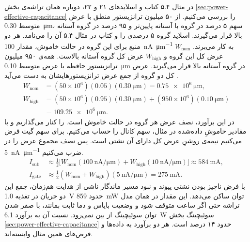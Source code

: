 در مثال ۵.۴ کتاب و اسلایدهای ۲۱ و ۲۲، دوباره همان تراشه‌ی بخش
\ref{sec:power-effective-capacitance} را بررسی می‌کنیم. از ۵۰ میلیون
ترانزیستور منطق با عرض متوسط \qty{0.30}{\micro\metre}، سهم
۵ درصد در گروه با آستانه پایین‌تر و ۹۵ درصد در گروه آستانه بالا
قرار می‌گیرند. اسلاید گروه ۵ درصدی را  و
کتاب در مثال ۵.۴ آن را  می‌نامد. هر دو منبع
برای این گروه در حالت خاموش، مقدار
\qty[per-mode=symbol]{100}{\nano\ampere\per\micro\metre}
به کار می‌برند. \(W_{\mathrm{nom}}\) عرض کل این گروه و
\(W_{\mathrm{high}}\) عرض کل گروه آستانه بالاست.
همه‌ی ۹۵۰ میلیون ترانزیستور حافظه با عرض متوسط
\qty{0.10}{\micro\metre} در گروه آستانه بالا قرار می‌گیرند.
عرض کل دو گروه از جمع عرض ترانزیستورهایشان به دست می‌آید
\cite[مثال ۵.۴، صفحه ۱۹۷]{weste}\cite[اسلایدهای ۲۱ و ۲۲]{powerslides}.
\[
  \begin{aligned}
    W_{\mathrm{nom}}&=(50\times10^6)(0.05)
                       (\qty{0.30}{\micro\metre})
                     =\qty{0.75e6}{\micro\metre},\\
    W_{\mathrm{high}}&=(50\times10^6)(0.95)
                        (\qty{0.30}{\micro\metre})
                        +(950\times10^6)(\qty{0.10}{\micro\metre})\\
                    &=\qty{109.25e6}{\micro\metre}.
  \end{aligned}
\]
در این برآورد، نصف عرض هر گروه در حالت خاموش است. 
را کنار می‌گذاریم و با مقادیر خاموشِ داده‌شده در مثال، سهم کانال را
حساب می‌کنیم. برای سهم گیت فرض می‌کنیم نیمه‌ی روشنِ عرض کل دارای
آن نشتی است. پس نصف مجموع عرض را در
\qty[per-mode=symbol]{5}{\nano\ampere\per\micro\metre} ضرب می‌کنیم.
\[
  \begin{aligned}
    I_{\mathrm{sub}} &\approx \tfrac12\bigl[
       W_{\mathrm{nom}}(\qty[per-mode=symbol]{100}{\nano\ampere\per\micro\metre})
      +W_{\mathrm{high}}(\qty[per-mode=symbol]{10}{\nano\ampere\per\micro\metre})
      \bigr]\approx\qty{584}{\milli\ampere},\\
    I_{\mathrm{gate}}&\approx\tfrac12(W_{\mathrm{nom}}+W_{\mathrm{high}})
        (\qty[per-mode=symbol]{5}{\nano\ampere\per\micro\metre})
        =\qty{275}{\milli\ampere}.
  \end{aligned}
\]
با فرض ناچیز بودن نشتی پیوند و نبود مسیر ماندگار ناشی از هدایت
هم‌زمان، جمع این دو جریان در تغذیه \qty{1.0}{\volt} حدود
\qty{859}{\milli\watt} توان ساکن می‌دهد. این مقدار در همان مدل
تراشه حتی اگر ساعت متوقف شود و وضعیت بایاس و دما ثابت بمانند،
با صفر شدن توان سوئیچینگ از بین نمی‌رود. نسبت آن به برآورد
\qty{6.1}{\watt} سوئیچینگ بخش \ref{sec:power-effective-capacitance}
حدود ۱۴ درصد است. هر دو برآورد به داده‌ها و فرض‌های همین مثال
وابسته‌اند.

